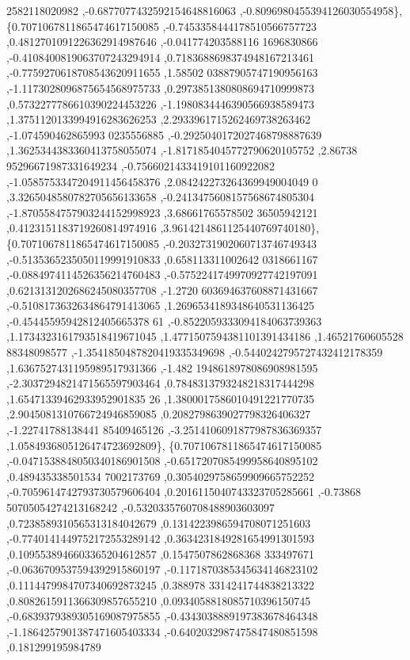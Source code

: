 \begin{DoxyCode}
      2582118020982 ,-0.6877077432592154648816063 ,-0.8096980455394126030554958\},
\{0.7071067811865474617150085 ,-0.7453358444178510566757723 ,0.4812701091226362914987646 ,-0.041774203588116
      1696830866 ,-0.4108400819063707243294914 ,0.7183688698374948167213461 ,-0.7759270618708543620911655 ,1.58502
      03887905747190956163 ,-1.1173028096875654568975733 ,0.2973851380808694710999873 ,0.5732277786610390224453226
       ,-1.1980834446390566938589473 ,1.3751120133994916283626253 ,2.2933961715262469738263462 ,-1.074590462865993
      0235556885 ,-0.2925040172027468798887639 ,1.3625344383360413758055074 ,-1.8171854045772790620105752 ,2.86738
      95296671987331649234 ,-0.7566021433419101160922082 ,-1.0585753347204911456458376 ,2.084242273264369949004049
      0 ,3.3265048580782705656133658 ,-0.2413475608157568674805304 ,-1.8705584757903244152998923 ,3.68661765578502
      36505942121 ,0.4123151183719260814974916 ,3.9614214861125440769740180\},
\{0.7071067811865474617150085 ,-0.2032731902060713746749343 ,-0.5135365235050119991910833 ,0.658113311002642
      0318661167 ,-0.0884974114526356214760483 ,-0.5752241749970927742197091 ,0.6213131202686245080357708 ,-1.2720
      603694637608871431667 ,-0.5108173632634864791413065 ,1.2696534189348640531136425 ,-0.45445595942812405665378
      61 ,-0.8522059333094184063739363 ,1.1734323161793518419671045 ,1.4771507594381101391434186 ,1.46521760605528
      88348098577 ,-1.3541850487820419335349698 ,-0.5440242795727432412178359 ,1.6367527431195989517931366 ,-1.482
      1948618978086908981595 ,-2.3037294821471565597903464 ,0.7848313793248218317444298 ,1.65471339462933952901835
      26 ,1.3800017586010491221770735 ,2.9045081310766724946859085 ,0.2082798639027798326406327 ,-1.22741788138441
      85409465126 ,-3.2514106091877987836369357 ,1.0584936805126474723692809\},
\{0.7071067811865474617150085 ,-0.0471538848050340186901508 ,-0.6517207085499958640895102 ,0.489435338501534
      7002173769 ,0.3054029758659909665752252 ,-0.7059614742793730579606404 ,0.2016115040743323705285661 ,-0.73868
      50705054274213168242 ,-0.5320335760708488903603097 ,0.7238589310565313184042679 ,0.1314223986594708071251603
       ,-0.7740141449752172553289142 ,0.3634231849281654991301593 ,0.1095538946603365204612857 ,0.1547507862868368
      333497671 ,-0.0636709537594392915860197 ,-0.1171870385345634146823102 ,0.1114479984707340692873245 ,0.388978
      3314241744838213322 ,0.8082615911366309857655210 ,0.0934058818085710396150745 ,-0.6839379389305169087975855 
      ,-0.4343038889197383678464348 ,-1.1864257901387471605403334 ,-0.6402032987475847480851598 ,0.181299195984789

\end{DoxyCode}
